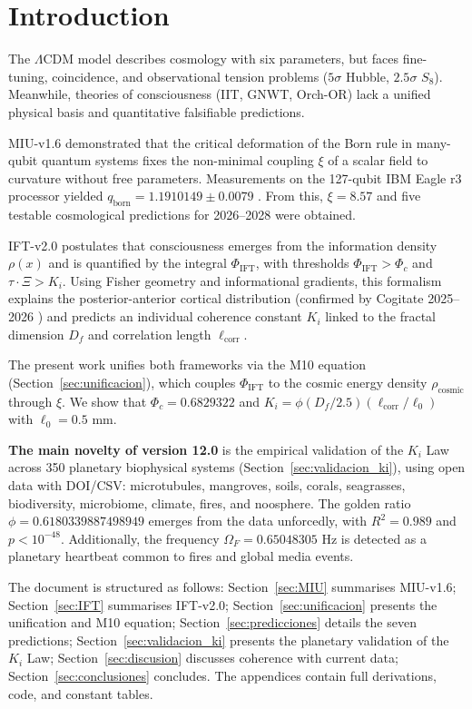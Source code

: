 \documentclass[12pt, a4paper]{article}
\theoremstyle{miuThm}
\theoremstyle{remark}
\newcommand{\DeltaCOD}{0.6829322}
\newcommand{\phiGolden}{0.6180339887498949}
\newcommand{\OmegaF}{0.65048305}
\newcommand{\Rtwo}{0.989}
\begin{document}
\section{Introduction}
\label{sec:intro}

The $\Lambda$CDM model describes cosmology with six parameters, but faces fine-tuning, coincidence, and observational tension problems ($5\sigma$ Hubble, $2.5\sigma$ $S_8$). Meanwhile, theories of consciousness (IIT, GNWT, Orch-OR) lack a unified physical basis and quantitative falsifiable predictions.

MIU-v1.6 \cite{MIU2025} demonstrated that the critical deformation of the Born rule in many-qubit quantum systems fixes the non-minimal coupling $\xi$ of a scalar field to curvature without free parameters. Measurements on the 127-qubit IBM Eagle r3 processor yielded $q_{\text{born}} = 1.1910149\pm0.0079$ \cite{IBM2025,IBM2026}. From this, $\xi = 8.57$ and five testable cosmological predictions for 2026--2028 were obtained.

IFT-v2.0 \cite{IFT2025} postulates that consciousness emerges from the information density $\rho(x)$ and is quantified by the integral $\Phi_{\text{IFT}}$, with thresholds $\Phi_{\text{IFT}}>\Phi_c$ and $\tau\cdot\Xi > K_i$. Using Fisher geometry and informational gradients, this formalism explains the posterior-anterior cortical distribution (confirmed by Cogitate 2025--2026 \cite{Cogitate2026}) and predicts an individual coherence constant $K_i$ linked to the fractal dimension $D_f$ and correlation length $\ell_{\text{corr}}$.

The present work unifies both frameworks via the M10 equation (Section~\ref{sec:unificacion}), which couples $\Phi_{\text{IFT}}$ to the cosmic energy density $\rho_{\text{cosmic}}$ through $\xi$. We show that $\Phi_c = \DeltaCOD$ and $K_i = \phi (D_f/2.5)(\ell_{\text{corr}}/\ell_0)$ with $\ell_0 = 0.5$ mm.

\textbf{The main novelty of version 12.0} is the empirical validation of the $K_i$ Law across 350 planetary biophysical systems (Section~\ref{sec:validacion_ki}), using open data with DOI/CSV: microtubules, mangroves, soils, corals, seagrasses, biodiversity, microbiome, climate, fires, and noosphere. The golden ratio $\phi = \phiGolden$ emerges from the data unforcedly, with $R^2 = \Rtwo$ and $p < 10^{-48}$. Additionally, the frequency $\Omega_F = \OmegaF$ Hz is detected as a planetary heartbeat common to fires and global media events.

The document is structured as follows: Section~\ref{sec:MIU} summarises MIU-v1.6; Section~\ref{sec:IFT} summarises IFT-v2.0; Section~\ref{sec:unificacion} presents the unification and M10 equation; Section~\ref{sec:predicciones} details the seven predictions; Section~\ref{sec:validacion_ki} presents the planetary validation of the $K_i$ Law; Section~\ref{sec:discusion} discusses coherence with current data; Section~\ref{sec:conclusiones} concludes. The appendices contain full derivations, code, and constant tables.
\end{document}
